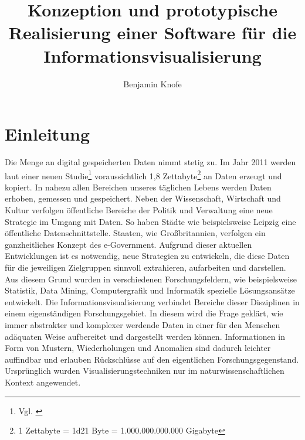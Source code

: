 \documentclass[a4paper, 
               12pt,
               DIV=calc,
               version=first,
               pdftex,
               headsepline,
               footsepline,
               bibtotocnumbered,
               liststotocnumbered]{scrreprt}
\begin{document}
\title{Konzeption und prototypische Realisierung einer Software für die Informationsvisualisierung}
\author{Benjamin Knofe}
\subject{Diplomarbeit}
\publishers{Hochschule für Technik, Wirtschaft und Kultur Leipzig}
\dedication{Danke\\für Kritik, Kommentare, Diskussionen, Code und Hilfe\\
(in alphabetischer Reihenfolge)\\
Christina Sanko, Pyry Jahkola, Ted Mosby, Sarah Walter,
Stephan Keller, Professor Dr.-Ing. Robert Müller, Philip Whitfield, Johannes Knofe, René Zschoch, Moritz Kreutzer, Theresia Becher}
\maketitle
\tableofcontents

\chapter{Einleitung}
\label{cha:Einleitung}
Die Menge an digital gespeicherten Daten nimmt stetig zu. Im Jahr 2011 werden laut einer neuen
Studie\footnote{Vgl. \citep{EMC}} voraussichtlich 1,8 Zettabyte\footnote{1 Zettabyte = \num{1d21}
Byte = 1.000.000.000.000 Gigabyte} an Daten erzeugt und kopiert. In nahezu allen Bereichen unseres
täglichen Lebens werden Daten erhoben, gemessen und gespeichert. Neben der Wissenschaft, Wirtschaft
und Kultur verfolgen öffentliche Bereiche der Politik und Verwaltung eine neue Strategie im Umgang
mit Daten. So haben Städte wie beispielsweise Leipzig eine öffentliche Datenschnittstelle.
Staaten, wie Großbritannien, verfolgen ein ganzheitliches Konzept des e-Government. Aufgrund dieser
aktuellen Entwicklungen ist es notwendig, neue Strategien zu entwickeln, die diese Daten
für die jeweiligen Zielgruppen sinnvoll extrahieren, aufarbeiten und darstellen. Aus diesem
Grund wurden in verschiedenen Forschungsfeldern, wie beispielsweise Statistik, Data Mining,
Computergrafik und Informatik spezielle Lösungsansätze entwickelt.
Die Informationsvisualisierung verbindet Bereiche dieser Disziplinen in einem eigenständigen
Forschungsgebiet.
In diesem wird die Frage geklärt, wie immer abstrakter und komplexer werdende Daten
in einer für den Menschen adäquaten Weise aufbereitet und dargestellt werden können. 
Informationen in Form von Mustern, Wiederholungen und Anomalien sind dadurch leichter auffindbar und erlauben
Rückschlüsse auf den eigentlichen Forschungsgegenstand. Ursprünglich wurden Visualisierungstechniken nur im
naturwissenschaftlichen Kontext angewendet.
\end{document}
